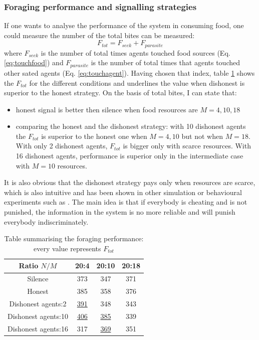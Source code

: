 \subsubsection{Foraging performance and signalling strategies}
If one wants to analyse the performance of the system in consuming food,
one could measure the number of the total bites can be measured:
\begin{equation}
 F_{tot}=F_{seek}+F_{parasite} \label{social:totbites}
\end{equation}
where $F_{seek}$ is the number of total times agents touched food sources (Eq. \ref{eq:touchfood})
and $F_{parasite}$ is the number of total times that agents touched other sated agents (Eq. \ref{eq:touchagent}).
Having chosen that index, table \ref{tab:totalPerformance} shows the $F_{tot}$ 
for the different conditions and underlines the value when dishonest is superior to 
the honest strategy.
On the basis of total bites, I can state that:
\begin{itemize}
\item honest signal is better then silence when food resources are $M=4,10,18$
\item comparing the honest and the dishonest strategy:
with 10 dishonest agents the $F_{tot}$ is superior to the honest one when $M=4,10$
but not when $M=18$. With only 2 dishonest agents, $F_{tot}$ is bigger only with scarce resources.
With 16 dishonest agents, performance is superior only in the intermediate case with $M=10$ resources.
\end{itemize}
It is also obvious that the dishonest strategy pays only when resources are scarce, 
which is also intuitive and has been shown in other simulation or
behavioural experiments such as \citet{Brembs1996:CheatingPrisonerDilemma,Schwieren2010:CompetitionCheating}.
The main idea is that if everybody is cheating and is not punished, the information
in the system is no more reliable and will punish everybody indiscriminately.

\begin{table}[htbp]
\caption[Social System foraging performance]{
Table summarising the foraging performance: every value represents $F_{tot}$}
\label{tab:totalPerformance}
\begin{center}
\small{
\begin{tabular}{@{}c|ccc@{}}
\hline
Ratio $N/M$ & 20:4 & 20:10 & 20:18\\
\hline
Silence & 373 & 347 & 371\\
\hline
Honest & 385 & 358 & 376\\
\hline
Dishonest agents:2 & \underline{391} & 348 & 343\\
Dishonest agents:10 & \underline{406} & \underline{385} & 339 \\
Dishonest agents:16 & 317 & \underline{369} & 351\\
\end{tabular}
}
\end{center}
\end{table}


